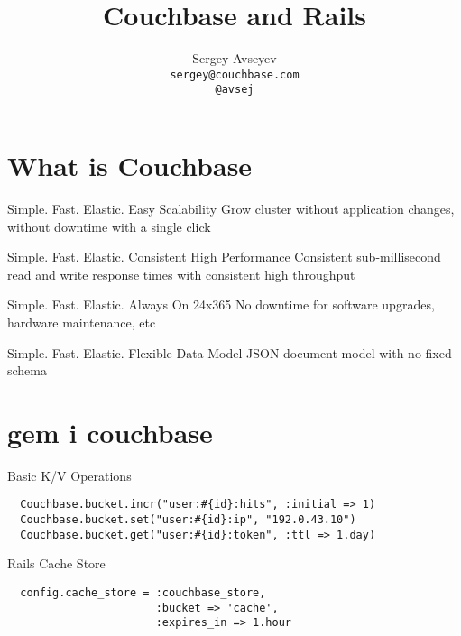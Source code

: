 \documentclass[aspectratio=43,handout]{beamer}
\title{Couchbase and Rails}
\author{Sergey Avseyev\\\texttt{sergey@couchbase.com}\\\texttt{@avsej}}
\begin{document}
\titleback
\begin{frame}
  \titlepage
\end{frame}

\section{What is Couchbase}

\begin{frame}{Simple. Fast. Elastic.}
  \claim
    {Easy Scalability}
    {Grow cluster without application changes, without downtime with a
     single click}
\end{frame}

\begin{frame}{Simple. Fast. Elastic.}
  \claim
    {Consistent High Performance}
    {Consistent sub-millisecond read and write response times with
     consistent high throughput}
\end{frame}

\begin{frame}{Simple. Fast. Elastic.}
  \claim
    {Always On 24x365}
    {No downtime for software upgrades, hardware maintenance, etc}
\end{frame}

\begin{frame}{Simple. Fast. Elastic.}
  \claim
    {Flexible Data Model}
    {JSON document model with no fixed schema}
\end{frame}

\section{gem i couchbase}
\begin{frame}[fragile]{Basic K/V Operations}
  \begin{verbatim}
  Couchbase.bucket.incr("user:#{id}:hits", :initial => 1)
  Couchbase.bucket.set("user:#{id}:ip", "192.0.43.10")
  Couchbase.bucket.get("user:#{id}:token", :ttl => 1.day)
  \end{verbatim}
\end{frame}

\begin{frame}[fragile]{Rails Cache Store}
  \begin{verbatim}
  config.cache_store = :couchbase_store,
                       :bucket => 'cache',
                       :expires_in => 1.hour
  \end{verbatim}
\end{frame}
\end{document}
